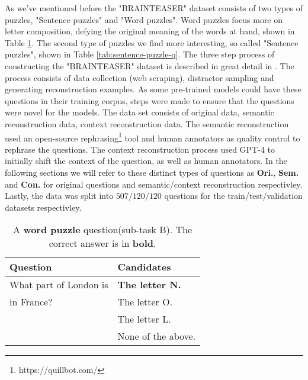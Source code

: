 As we've mentioned before the "BRAINTEASER" dataset consists of two types of puzzles, "Sentence puzzles"
and "Word puzzles".  Word puzzles focus more on letter composition, defying the original meaning
of the words at hand, shown in Table \ref{tab:word-puzzle-q}.
The second type of puzzles we find more interesting, so called "Sentence puzzles", shown in Table
\ref{tab:sentence-puzzle-q}. The three step process of constructing the "BRAINTEASER" dataset
is described in great detail in \citep{semeval}. The process consists of data collection
(web scraping),
distractor sampling and generating reconstruction examples. As some pre-trained models could have
these questions in their training corpus, steps were made to ensure that the questions were novel
for the models.  The data set consists of original data, semantic reconstruction data, context
reconstruction data. The semantic reconstruction used an open-source rephrasing\footnote[2]{https://quillbot.com/} tool and
human annotators as quality control to rephrase the questions. The context reconstruction process
used GPT-4 to initially shift the context of the question, as well as human annotators. In the
following sections we will refer to these distinct types of questions as \textbf{Ori.},
\textbf{Sem.} and
\textbf{Con.} for original questions and semantic/context reconstruction respectivley. Lastly, the
data was split into $507/120/120$ questions for the train/test/validation datasets respectivley.


\begin{table}
	\caption{A \textbf{word puzzle} question(sub-task B). The correct answer is in \textbf{bold}.}
	\label{tab:word-puzzle-q}
	\begin{center}
		\begin{tabular}{p{3.5cm}|p{3.5cm}}
			\toprule
			Question               & Candidates             \\
			\midrule
			What part of London is & \textbf{The letter N.} \\
			in France?             & The letter O.          \\
			                       & The letter L.          \\
			                       & None of the above.     \\
			\bottomrule
		\end{tabular}
	\end{center}
\end{table}




